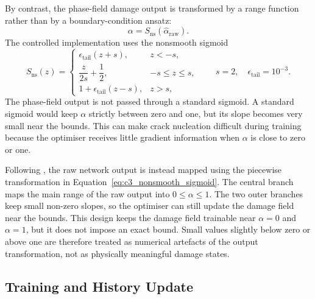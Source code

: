 By contrast, the phase-field damage output is transformed by a range function rather than by a boundary-condition ansatz:
\begin{equation}
    \alpha = S_{\mathrm{ns}}(\hat{\alpha}_{\mathrm{raw}}).
    \label{eq:c3_alpha_transform}
\end{equation}
The controlled implementation uses the nonsmooth sigmoid
\begin{equation}
    S_{\mathrm{ns}}(z)
    =
    \begin{cases}
    \epsilon_{\mathrm{tail}}(z+s), & z<-s,\\[3pt]
    \dfrac{z}{2s}+\dfrac{1}{2}, & -s\le z\le s,\\[6pt]
    1+\epsilon_{\mathrm{tail}}(z-s), & z>s,
    \end{cases}
    \qquad
    s=2,\quad
    \epsilon_{\mathrm{tail}}=10^{-3}.
    \label{eq:c3_nonsmooth_sigmoid}
\end{equation}
The phase-field output is not passed through a standard sigmoid. A standard sigmoid would keep $\alpha$ strictly between zero and one, but its slope becomes very small near the bounds. This can make crack nucleation difficult during training because the optimiser receives little gradient information when $\alpha$ is close to zero or one.

Following \citet{Manav2024cmame}, the raw network output is instead mapped using the piecewise transformation in Equation~\ref{eq:c3_nonsmooth_sigmoid}. The central branch maps the main range of the raw output into $0\le\alpha\le1$. The two outer branches keep small non-zero slopes, so the optimiser can still update the damage field near the bounds. This design keeps the damage field trainable near $\alpha=0$ and $\alpha=1$, but it does not impose an exact bound. Small values slightly below zero or above one are therefore treated as numerical artefacts of the output transformation, not as physically meaningful damage states.



\subsection{Training and History Update}
\label{subsec:c3_history_irreversibility}

